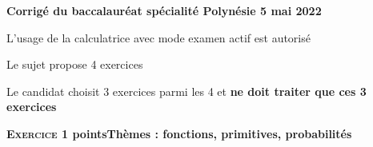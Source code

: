 \documentclass[11pt]{article}
\begin{document}
\setlength\parindent{0mm}
\lfoot{\small{}}
\pagestyle{fancy}
\thispagestyle{empty}
\begin{center}
{\Large \textbf{Corrigé du baccalauréat spécialité Polynésie 5 mai 2022}}
\bigskip


L'usage de la calculatrice avec mode examen actif est autorisé
\end{center}
\medskip

Le sujet propose 4 exercices

Le candidat choisit 3 exercices parmi les 4 et \textbf{ne doit traiter que ces 3 exercices}

\bigskip

\textbf{\textsc{Exercice 1}  points\hfill Thèmes : fonctions, primitives, probabilités}

\medskip


\medskip
\end{document}
